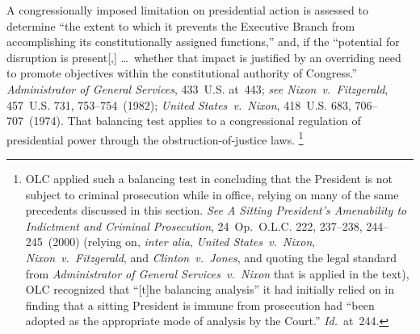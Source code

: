 A congressionally imposed limitation on presidential action is assessed to determine ``the extent to which it prevents the Executive Branch from accomplishing its constitutionally assigned functions,'' and, if the ``potential for disruption is present[,] \dots\ whether that impact is justified by an overriding need to promote objectives within the constitutional authority of Congress.''
\textit{Administrator of General Services}, 433~U.S. at~443;
\textit{see Nixon~v.\ Fitzgerald}, 457~U.S. 731, 753--754~(1982);
\textit{United States~v.\ Nixon}, 418~U.S. 683, 706--707~(1974).
That balancing test applies to a congressional regulation of presidential power through the obstruction-of-justice laws.%
\footnote{OLC applied such a balancing test in concluding that the President is not subject to criminal prosecution while in office, relying on many of the same precedents discussed in this section.
\textit{See A Sitting President's Amenability to Indictment and Criminal Prosecution}, 24~Op.\ O.L.C. 222, 237--238, 244--245~(2000) (relying on, \textit{inter alia}, \textit{United States~v.\ Nixon}, \textit{Nixon~v.\ Fitzgerald}, and \textit{Clinton~v.\ Jones}, and quoting the legal standard from \textit{Administrator of General Services~v.\ Nixon} that is applied in the text), OLC recognized that ``[t]he balancing analysis'' it had initially relied on in finding that a sitting President is immune from prosecution had ``been adopted as the appropriate mode of analysis by the Court.''
\textit{Id.}~at~244.}

